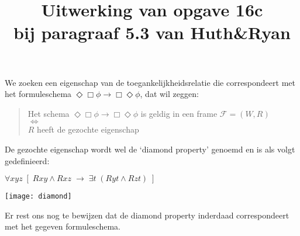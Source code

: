 \documentclass[a4paper,11pt]{article}
\title{Uitwerking van opgave 16c\\
\normalsize{bij paragraaf 5.3 van Huth\&Ryan}}
\date{}
\begin{document}
\maketitle


We zoeken een eigenschap van de toegankelijkheidsrelatie die correspondeert
met het formuleschema $\Diamond \Box \phi \rightarrow \Box \Diamond \phi$,
dat wil zeggen:

\begin{quote}
  Het schema $\Diamond \Box \phi \rightarrow \Box \Diamond \phi$ is geldig in
  een frame
  $\mathcal{F} = (W, R)$ \\
  $\Longleftrightarrow$ \\
  $R$ heeft de gezochte eigenschap
\end{quote}
De gezochte eigenschap wordt wel de `diamond property' genoemd en is als
volgt gedefinieerd:
\begin{table}[!hm]
  \begin{minipage}[t]{0.65\linewidth}\centering
    \vspace{10pt}
  $\forall xyz \; [ \; Rxy \wedge Rxz \; \rightarrow \; \exists t \; (
    Ryt \wedge Rzt ) \; ]$
  \end{minipage}
  \hfill
  \begin{minipage}[t]{0.3\linewidth}\centering
    \vspace{0pt}\raggedright
  \texttt{[image: diamond]}
  \end{minipage}
\end{table}

Er rest ons nog te bewijzen dat de diamond property inderdaad correspondeert
met het gegeven formuleschema.
\end{document}
